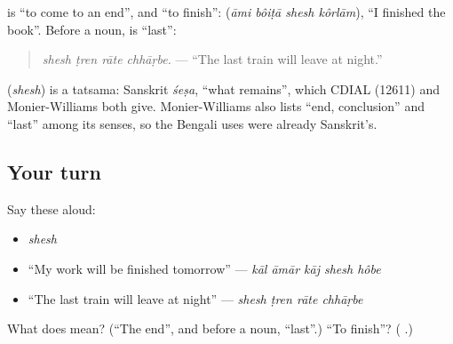 \textbf{ } is \textquotedblleft{}to come to an end\textquotedblright{}, and \textbf{ } \textquotedblleft{}to finish\textquotedblright{}: \textbf{   } (\emph{āmi bôiṭā shesh kôrlām}), \textquotedblleft{}I finished the book\textquotedblright{}. Before a noun, \textbf{} is \textquotedblleft{}last\textquotedblright{}:

\begin{quote}
\textbf{   }
\end{quote}

\begin{quote}
\emph{shesh ṭren rāte chhāṛbe.} — \textquotedblleft{}The last train will leave at night.\textquotedblright{}
\end{quote}

\begin{cousinweb}
\textbf{} (\emph{shesh}) is a tatsama: Sanskrit \emph{śeṣa}, \textquotedblleft{}what remains\textquotedblright{}, which CDIAL (12611) and Monier-Williams both give. Monier-Williams also lists \textquotedblleft{}end, conclusion\textquotedblright{} and \textquotedblleft{}last\textquotedblright{} among its senses, so the Bengali uses were already Sanskrit's.
\end{cousinweb}

\subsection*{Your turn}
Say these aloud:

\begin{itemize}
\raggedright
  \item \emph{shesh}
  \item \textquotedblleft{}My work will be finished tomorrow\textquotedblright{} — \emph{kāl āmār kāj shesh hôbe}
  \item \textquotedblleft{}The last train will leave at night\textquotedblright{} — \emph{shesh ṭren rāte chhāṛbe}
\end{itemize}

\begin{tcolorbox}[breakable,colback=teal!4,colframe=teal!35!black,title={Before you move on}]
What does \textbf{} mean? (\textquotedblleft{}The end\textquotedblright{}, and before a noun, \textquotedblleft{}last\textquotedblright{}.) \textquotedblleft{}To finish\textquotedblright{}? (\textbf{ }.)
\end{tcolorbox}
